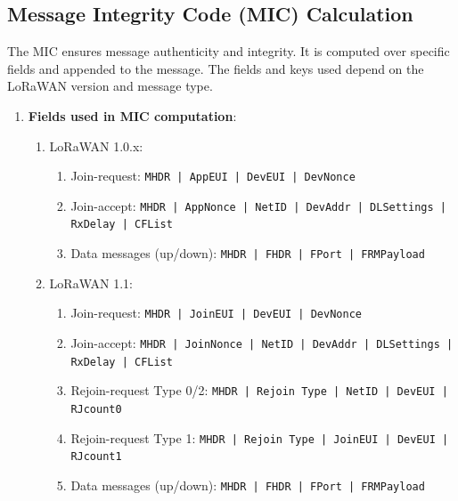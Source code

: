 \subsection{Message Integrity Code (MIC) Calculation}

The MIC ensures message authenticity and integrity. It is computed over specific fields and appended to the message. The fields and keys used depend on the LoRaWAN version and message type.

\begin{enumerate}
    \item \textbf{Fields used in MIC computation}:
          \begin{enumerate}
              \item LoRaWAN 1.0.x:
                    \begin{enumerate}
                        \item Join-request: \texttt{MHDR | AppEUI | DevEUI | DevNonce}
                        \item Join-accept: \texttt{MHDR | AppNonce | NetID | DevAddr | DLSettings | RxDelay | CFList}
                        \item Data messages (up/down): \texttt{MHDR | FHDR | FPort | FRMPayload}
                    \end{enumerate}
              \item LoRaWAN 1.1:
                    \begin{enumerate}
                        \item Join-request: \texttt{MHDR | JoinEUI | DevEUI | DevNonce}
                        \item Join-accept: \texttt{MHDR | JoinNonce | NetID | DevAddr | DLSettings | RxDelay | CFList}
                        \item Rejoin-request Type 0/2: \texttt{MHDR | Rejoin Type | NetID | DevEUI | RJcount0}
                        \item Rejoin-request Type 1: \texttt{MHDR | Rejoin Type | JoinEUI | DevEUI | RJcount1}
                        \item Data messages (up/down): \texttt{MHDR | FHDR | FPort | FRMPayload}
                    \end{enumerate}
          \end{enumerate}


\end{enumerate}

